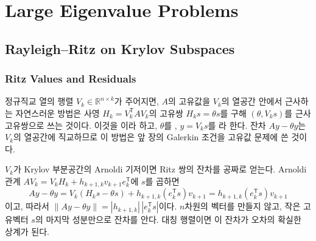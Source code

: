 \chapter{Large Eigenvalue Problems}
\label{ch:large-eigen}


\section{Rayleigh--Ritz on Krylov Subspaces}
\label{sec:ritz}

\subsection{Ritz Values and Residuals}

정규직교 열의 행렬 $V_k\in\mathbb R^{n\times k}$가 주어지면, $A$의 고유값을 $V_k$의 열공간 안에서 근사하는 자연스러운 방법은 사영 $H_k=V_k^{\mathsf T}AV_k$의 고유쌍 $H_ks=\theta s$를 구해 $(\theta,V_ks)$를 근사 고유쌍으로 쓰는 것이다. 이것을 이라 하고, $\theta$를 , $y=V_ks$를 라 한다. 잔차 $Ay-\theta y$는 $V_k$의 열공간에 직교하므로 이 방법은 앞 장의 Galerkin 조건을 고유값 문제에 쓴 것이다.

$V_k$가 Krylov 부분공간의 Arnoldi 기저이면 Ritz 쌍의 잔차를 공짜로 얻는다. Arnoldi 관계 $AV_k=V_kH_k+h_{k+1,k}v_{k+1}e_k^{\mathsf T}$에 $s$를 곱하면
\begin{equation}
\label{eq:ritz-residual}
Ay-\theta y=V_k(H_ks-\theta s)+h_{k+1,k}(e_k^{\mathsf T}s)v_{k+1}=h_{k+1,k}(e_k^{\mathsf T}s)v_{k+1}
\end{equation}
이고, 따라서 $\|Ay-\theta y\|=|h_{k+1,k}|\,|e_k^{\mathsf T}s|$이다. $n$차원의 벡터를 만들지 않고, 작은 고유벡터 $s$의 마지막 성분만으로 잔차를 안다. 대칭 행렬이면 이 잔차가 오차의 확실한 상계가 된다.

